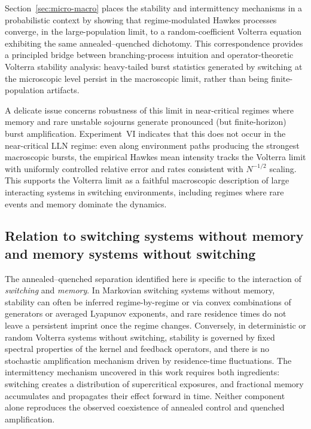 \documentclass[12pt,a4paper]{article}
\theoremstyle{plain}
\theoremstyle{definition}
\theoremstyle{remark}
\begin{document}
Section~\ref{sec:micro-macro} places the stability and intermittency
mechanisms in a probabilistic context by showing that regime-modulated Hawkes
processes converge, in the large-population limit, to a random-coefficient
Volterra equation exhibiting the same annealed--quenched dichotomy.
This correspondence provides a principled bridge between branching-process
intuition and operator-theoretic Volterra stability analysis: heavy-tailed burst
statistics generated by switching at the microscopic level persist in the
macroscopic limit, rather than being finite-population artifacts.

A delicate issue concerns robustness of this limit in near-critical regimes where
memory and rare unstable sojourns generate pronounced (but finite-horizon) burst
amplification.
Experiment~VI indicates that this does not occur in the near-critical LLN regime:
even along environment paths producing the strongest macroscopic bursts, the
empirical Hawkes mean intensity tracks the Volterra limit with uniformly
controlled relative error and rates consistent with $N^{-1/2}$ scaling.
This supports the Volterra limit as a faithful macroscopic description of large
interacting systems in switching environments, including regimes where rare events
and memory dominate the dynamics.

\subsection*{Relation to switching systems without memory and memory systems without switching}

The annealed--quenched separation identified here is specific to the interaction
of \emph{switching} and \emph{memory}.
In Markovian switching systems without memory, stability can often be inferred
regime-by-regime or via convex combinations of generators or averaged Lyapunov
exponents, and rare residence times do not leave a persistent imprint once the
regime changes.
Conversely, in deterministic or random Volterra systems without switching,
stability is governed by fixed spectral properties of the kernel and feedback
operators, and there is no stochastic amplification mechanism driven by
residence-time fluctuations.
The intermittency mechanism uncovered in this work requires both ingredients:
switching creates a distribution of supercritical exposures, and fractional memory
accumulates and propagates their effect forward in time.
Neither component alone reproduces the observed coexistence of annealed control
and quenched amplification.
\end{document}
